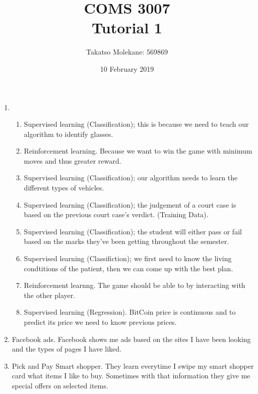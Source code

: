 \documentclass[11pt]{article}
\title{COMS 3007\\ Tutorial 1}
\author{Takatso Molekane: 569869}
\date{10 February 2019}
\begin{document}
	\maketitle
	
	\begin{enumerate}
	\item
		\begin{enumerate}
			\item Supervised learning (Classification); this is because we need to teach our algorithm to identify glasses.
			\item Reinforcement learning. Because we want to win the game with minimum moves and thus greater reward.
			\item Supervised learning (Classification); our algorithm needs to learn the different types of vehicles.
			\item Supervised learning (Classification); the judgement of a court case is based on the previous court case's verdict. (Training Data).
			\item Supervised learning (Classification); the student will either pass or fail based on the marks they've been getting throughout the semester.
			\item Supervised learning (Classifiction); we first need  to know the living condtitions of the patient, then we can come up with the best plan.
			\item Reinforcement learnng. The game should be able to by interacting with the other player.
			\item Supervised learning (Regression). BitCoin price is continuous and to predict its price we need to know previous prices.
		\end{enumerate}
		
	\item Facebook ads. Facebook shows me ads based on the sites I have been looking and the types of pages I have liked.
	
	\item Pick and Pay Smart shopper. They learn everytime I swipe my smart shopper card what items I like to buy. Sometimes with that information they give me special offers on selected items.
	

\end{enumerate}
\end{document}
